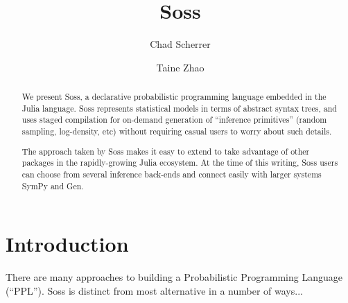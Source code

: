 \documentclass[anonymous=false, %
               format=acmsmall, %
               review=true, %
               screen=true, %
               nonacm=true]{acmart}
\begin{document}
\title{Soss}

\author{Chad Scherrer}

\author{Taine Zhao}

\begin{abstract}
We present Soss, a declarative probabilistic programming language embedded in the Julia language. Soss represents statistical models in terms of abstract syntax trees, and uses staged compilation for on-demand generation of ``inference primitives'' (random sampling, log-density, etc) without requiring casual users to worry about such details.

The approach taken by Soss makes it easy to extend to take advantage of other packages in the rapidly-growing Julia ecosystem. At the time of this writing, Soss users can choose from several inference back-ends and connect easily with larger systems SymPy and Gen.
\end{abstract}

\maketitle

\section{Introduction}

There are many approaches to building a Probabilistic Programming Language (``PPL''). Soss is distinct from most alternative in a number of ways...
\end{document}

